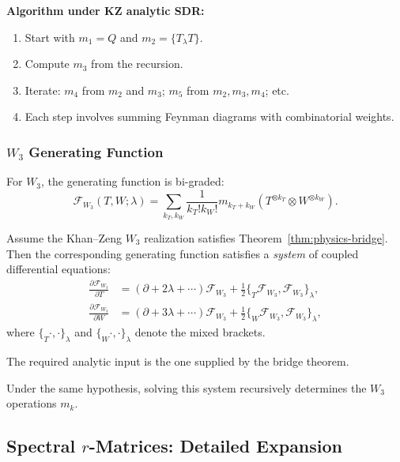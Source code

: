 \textbf{Algorithm under KZ analytic SDR:}
\begin{enumerate}
\item Start with $m_1 = Q$ and $m_2 = \{T_\lambda T\}$.
\item Compute $m_3$ from the recursion.
\item Iterate: $m_4$ from $m_2$ and $m_3$; $m_5$ from $m_2, m_3, m_4$; etc.
\item Each step involves summing Feynman diagrams with combinatorial weights.
\end{enumerate}

\subsubsection{$W_3$ Generating Function}

For $W_3$, the generating function is bi-graded:
\begin{equation}
\mathcal{F}_{W_3}(T, W; \lambda) = \sum_{k_T, k_W} \frac{1}{k_T! k_W!} m_{k_T + k_W}(T^{\otimes k_T} \otimes W^{\otimes k_W}).
\end{equation}

\begin{theorem}
Assume the Khan--Zeng $W_3$ realization satisfies
Theorem~\ref{thm:physics-bridge}. Then the corresponding generating
function satisfies a \emph{system} of coupled differential equations:
\begin{align}
\frac{\partial \mathcal{F}_{W_3}}{\partial T} &= (\partial + 2\lambda + \cdots) \mathcal{F}_{W_3} + \frac{1}{2} \{_T \mathcal{F}_{W_3}, \mathcal{F}_{W_3}\}_\lambda,\\
\frac{\partial \mathcal{F}_{W_3}}{\partial W} &= (\partial + 3\lambda + \cdots) \mathcal{F}_{W_3} + \frac{1}{2} \{_W \mathcal{F}_{W_3}, \mathcal{F}_{W_3}\}_\lambda,
\end{align}
where $\{_T \cdot, \cdot \}_\lambda$ and $\{_W \cdot, \cdot \}_\lambda$ denote the mixed brackets.
\end{theorem}

The required analytic input is the one supplied by the bridge theorem.

Under the same hypothesis, solving this system recursively determines
the $W_3$ operations $m_k$.

\subsection{Spectral $r$-Matrices: Detailed Expansion}

